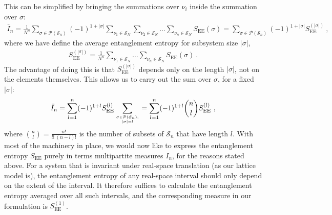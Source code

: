 \documentclass[reprint,hidelinks,onecolumn]{revtex4-2}
\begin{document}
This can be simplified by bringing the summations over \(\nu_i\) inside the summation over \(\sigma\):
\begin{equation}\begin{aligned}
	\bar I_n = \frac{1}{N^n}\sum_{\sigma \in \mathcal{P}\left(\mathcal{S}_n\right)} (-1)^{1 + |\sigma|} \sum_{\nu_1 \in \mathcal{S}_N} \sum_{\nu_2 \in \mathcal{S}_N}\ldots\sum_{\nu_n \in \mathcal{S}_N}S_\text{EE}(\sigma) = \sum_{\sigma \in \mathcal{P}\left(\mathcal{S}_n\right)} (-1)^{1 + |\sigma|} S_\text{EE}^{(|\sigma|)} ~,
\end{aligned}\end{equation}
where we have define the average entanglement entropy for subsystem size \(|\sigma|\), 
\begin{equation}\begin{aligned}
	S_\text{EE}^{(|\sigma|)} = \frac{1}{N^n}\sum_{\nu_1 \in \mathcal{S}_N} \ldots\sum_{\nu_n \in \mathcal{S}_N}S_\text{EE}(\sigma)~.
\end{aligned}\end{equation}
The advantage of doing this is that \(S_\text{EE}^{(|\sigma|)}\) depends only on the length \(|\sigma|\), not on the elements themselves. This allows us to carry out the sum over \(\sigma\), for a fixed \(|\sigma|\):
\begin{equation}\begin{aligned}
	\bar I_n = \sum_{l=1}^n  (-1)^{1+l} S_\text{EE}^{(l)}\sum_{\sigma \in \mathcal{P}\left(\mathcal{S}_n\right),\atop{|\sigma|=l}} = \sum_{l=1}^n  (-1)^{1+l} \binom{n}{l} S_\text{EE}^{(l)} ~,
\end{aligned}\end{equation}
where \(\binom{n}{l} = \frac{n!}{l!~(n-l)!}\) is the number of subsets of \(\mathcal{S}_n\) that have length \(l\). With most of the machinery in place, we would now like to express the entanglement entropy \(S_\text{EE}\) purely in terms multipartite measures \(I_n\), for the reasons stated above. For a system that is invariant under real-space translation (as our lattice model is), the entanglement entropy of any real-space interval should only depend on the extent of the interval. It therefore suffices to calculate the entanglement entropy averaged over all such intervals, and the corresponding measure in our formulation is \(S_\text{EE}^{(1)}\). 
\end{document}
